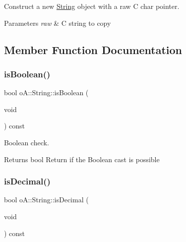 Construct a new \mbox{\hyperlink{classo_a_1_1_string}{String}} object with a raw C char pointer. 


\begin{DoxyParams}{Parameters}
{\em raw} & C string to copy \\
\hline
\end{DoxyParams}


\subsection{Member Function Documentation}
\mbox{\label{classo_a_1_1_string_af57b0b992d2ce2995f3f843d7dd36e96}} 
\subsubsection{\texorpdfstring{is\+Boolean()}{isBoolean()}}
{\footnotesize\ttfamily bool o\+A\+::\+String\+::is\+Boolean (\begin{DoxyParamCaption}\item[{void}]{ }\end{DoxyParamCaption}) const\hspace{0.3cm}{\ttfamily [noexcept]}}



Boolean check. 

\begin{DoxyReturn}{Returns}
bool Return if the Boolean cast is possible 
\end{DoxyReturn}
\mbox{\label{classo_a_1_1_string_a30effa3311ecb3f5f29e8d670709f436}} 
\subsubsection{\texorpdfstring{is\+Decimal()}{isDecimal()}}
{\footnotesize\ttfamily bool o\+A\+::\+String\+::is\+Decimal (\begin{DoxyParamCaption}\item[{void}]{ }\end{DoxyParamCaption}) const\hspace{0.3cm}{\ttfamily [noexcept]}}



